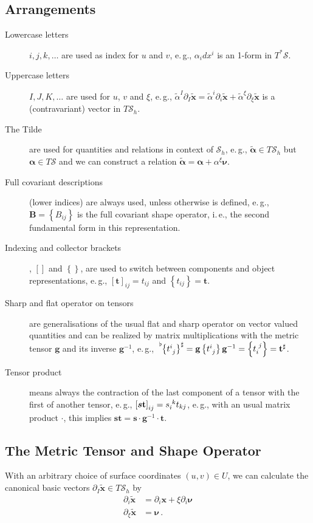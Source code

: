 \documentclass[a4paper,10pt]{scrartcl}
\newcommand{\surf}{\mathcal{S}}
\newcommand{\surfh}{\surf_{h}}
\newcommand{\xb}{\mathbf{x}}
\newcommand{\txb}{\tilde{\xb}}
\newcommand{\nub}{\bm{\nu}}
\newcommand{\gb}{\mathbf{g}}
\newcommand{\tb}{\mathbf{t}}
\newcommand{\Bb}{\mathbf{B}}
\newcommand{\alphab}{\bm{\alpha}}
\newcommand{\formPeriod}{\,\text{.}}
\newcommand{\ie}{i.\,e.}%
\newcommand{\eg}{e.\,g.}
\begin{document}
\subsection{Arrangements}
\begin{description}
  \item[Lowercase letters] \( i,j,k,\ldots \) are used as index for \( u \) and \( v \), \eg, \( \alpha_{i}dx^{i} \) is an 1-form in \( T^{*}\surf \).
  \item[Uppercase letters] \( I,J,K,\ldots \)  are used for \( u \), \( v \) and \( \xi \), \eg, 
  \( \tilde{\alpha}^{I}\partial_{I}\txb = \tilde{\alpha}^{i}\partial_{i}\txb +\tilde{\alpha}^{\xi}\partial_{\xi}\txb \) is a (contravariant) vector in \( T\surfh \).
  \item[The Tilde] are used for quantities and relations in context of \( \surfh \),
        \eg, \(  \tilde{\alphab}\in T\surfh \) but \( \alphab\in  T\surf\) and we can construct a relation \( \tilde{\alphab} = \alphab + \alpha^{\xi}\nub \).
  \item[Full covariant descriptions] (lower indices) are always used, unless otherwise is defined,
        \eg, \( \Bb = \left\{ B_{ij} \right\} \) is the full covariant shape operator, \ie, the second fundamental form in this representation.
  \item[Indexing and collector brackets], \( \left[  \right] \) and \( \left\{  \right\} \), are used to switch between components and object representations, \eg,
      \( \left[ \tb \right]_{ij} = t_{ij} \) and \( \left\{ t_{ij} \right\} = \tb \).
  \item[Sharp and flat operator on tensors] are generalisations of the usual flat and sharp operator on vector valued quantities and can be realized by matrix multiplications with the
  metric tensor \( \gb \) and its inverse \( \gb^{-1} \),
          \eg, \( \tensor[^\flat]{\left\{ \tensor{t}{^{i}_{j}} \right\}}{^{\sharp}} = \gb\left\{ \tensor{t}{^{i}_{j}} \right\}\gb^{-1} 
                  =  \left\{ \tensor{t}{_{i}^{j}} \right\} = \tb^{\sharp} \).
  \item[Tensor product] means always the contraction of the last component of a tensor with the first of another tensor,
          \eg, \( \left[ \bm{s}\tb \right]_{ij} = \tensor{s}{_{i}^{k}}t_{kj} \), \eg, with an usual matrix product \( \cdot \), 
            this implies \( \bm{s}\tb = \bm{s}\cdot\gb^{-1}\cdot\tb \).
\end{description}

\subsection{The Metric Tensor and Shape Operator}
With an arbitrary choice of surface coordinates \( (u,v)\in U \), we can calculate the canonical basic vectors \( \partial_{I}\txb\in T\surfh \) by
\begin{align}
  \partial_{i}\txb &= \partial_{i}\xb + \xi\partial_{i}\nub \\
  \partial_{\xi}\txb &= \nub \formPeriod
\end{align}
\end{document}
